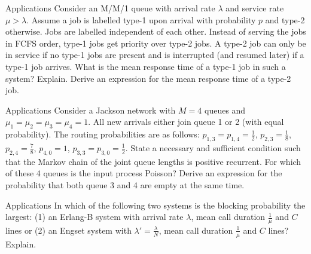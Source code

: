 \begin{problem}{Applications}
    Consider an M/M/1 queue with arrival rate $\lambda$ and service rate $\mu > \lambda$. Assume a job is labelled type-1 upon arrival with probability $p$ and type-2 otherwise. Jobs are labelled independent of each other. Instead of serving the jobs in FCFS order, type-1 jobs get priority over type-2 jobs. A type-2 job can only be in service if no type-1 jobs are present and is interrupted (and resumed later) if a type-1 job arrives. What is the mean response time of a type-1 job in such a system? Explain. Derive an expression for the mean response time of a type-2 job.
\end{problem}

\begin{problem}{Applications}
   Consider a Jackson network with $M = 4$ queues and $\mu_1 = \mu_2 = \mu_3 = \mu_4 = 1$. All new arrivals either join queue 1 or 2 (with equal probability). The routing probabilities are as follows: $ p_{1,3} = p_{1,4} = \frac{1}{2}$, $p_{2,3} = \frac{1}{8}$, $p_{2,4} = \frac{7}{8}$, $p_{4,0} = 1$, $p_{3,3} = p_{3,0} = \frac{1}{2}$. State a necessary and sufficient condition such that the Markov chain of the joint queue lengths is positive recurrent. For which of these 4 queues is the input process Poisson? Derive an expression for the probability that both queue 3 and 4 are empty at the same time.
\end{problem}

\begin{problem}{Applications}
   In which of the following two systems is the blocking probability the largest: (1) an Erlang-B system with arrival rate $\lambda$, mean call duration $\frac{1}{\mu}$ and $C$ lines or (2) an Engset system with $\lambda' = \frac{\lambda}{N}$, mean call duration $\frac{1}{\mu}$ and $C$ lines? Explain.
\end{problem}
